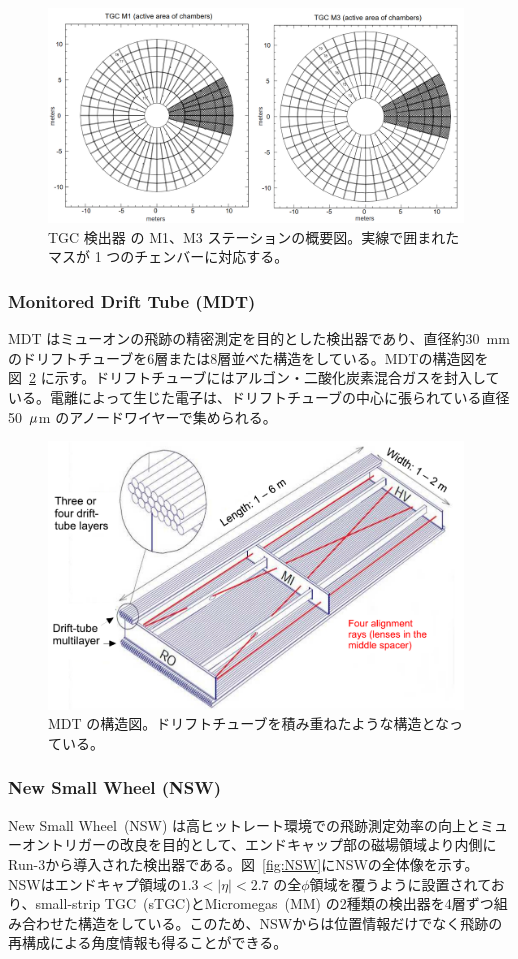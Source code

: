 \begin{figure}[tb]
  \centering
  \includegraphics[clip, width=11cm]{fig/2/TGC_octant.png}
  \caption{TGC 検出器 の M1、M3 ステーションの概要図\cite{Lellouch:684103}。実線で囲まれたマスが 1 つのチェンバーに対応する。}
  \label{fig:TGC_oc}
\end{figure}

\subsubsection{Monitored Drift Tube (MDT)}
MDT はミューオンの飛跡の精密測定を目的とした検出器であり、直径約30~mmのドリフトチューブを6層または8層並べた構造をしている。MDTの構造図を図~\ref{fig:MDT} に示す。ドリフトチューブにはアルゴン・二酸化炭素混合ガスを封入している。電離によって生じた電子は、ドリフトチューブの中心に張られている直径50~$\rm{\mu}$m のアノードワイヤーで集められる。


\begin{figure}[tb]
  \centering
  \includegraphics[clip, width=11cm]{fig/2/MDT_chamber_schematics_2.pdf}
  \caption{MDT の構造図\cite{Aad:1129811}。ドリフトチューブを積み重ねたような構造となっている。}
  \label{fig:MDT}
\end{figure}


\subsubsection{New Small Wheel (NSW)}
New Small Wheel~(NSW) は高ヒットレート環境での飛跡測定効率の向上とミューオントリガーの改良を目的として、エンドキャップ部の磁場領域より内側にRun-3から導入された検出器である。図~\ref{fig:NSW}にNSWの全体像を示す。
NSWはエンドキャプ領域の$1.3 < |\eta| < 2.7$ の全$\phi$領域を覆うように設置されており、small-strip TGC~(sTGC)とMicromegas~(MM) の2種類の検出器を4層ずつ組み合わせた構造をしている。このため、NSWからは位置情報だけでなく飛跡の再構成による角度情報も得ることができる。

